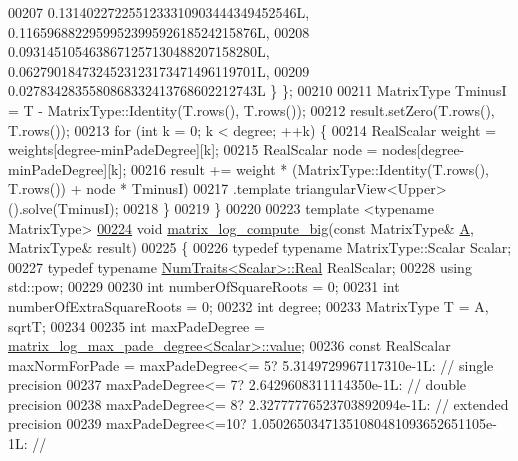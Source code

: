 \begin{DoxyCode}
00207       0.1314022722551233310903444349452546L, 0.1165968822959952399592618524215876L,
00208       0.0931451054638671257130488207158280L, 0.0627901847324523123173471496119701L,
00209       0.0278342835580868332413768602212743L \} \};
00210 
00211   MatrixType TminusI = T - MatrixType::Identity(T.rows(), T.rows());
00212   result.setZero(T.rows(), T.rows());
00213   \textcolor{keywordflow}{for} (\textcolor{keywordtype}{int} k = 0; k < degree; ++k) \{
00214     RealScalar weight = weights[degree-minPadeDegree][k];
00215     RealScalar node = nodes[degree-minPadeDegree][k];
00216     result += weight * (MatrixType::Identity(T.rows(), T.rows()) + node * TminusI)
00217                        .template triangularView<Upper>().solve(TminusI);
00218   \}
00219 \} 
00220 
00223 \textcolor{keyword}{template} <\textcolor{keyword}{typename} MatrixType>
\hyperlink{namespace_eigen_1_1internal_ac2de7acbbff34ec236ee5e9fdb2eee38}{00224} \textcolor{keywordtype}{void} \hyperlink{namespace_eigen_1_1internal_ac2de7acbbff34ec236ee5e9fdb2eee38}{matrix\_log\_compute\_big}(\textcolor{keyword}{const} MatrixType& \hyperlink{group___core___module_class_eigen_1_1_matrix}{A}, MatrixType& result)
00225 \{
00226   \textcolor{keyword}{typedef} \textcolor{keyword}{typename} MatrixType::Scalar Scalar;
00227   \textcolor{keyword}{typedef} \textcolor{keyword}{typename} \hyperlink{group___core___module_struct_eigen_1_1_num_traits}{NumTraits<Scalar>::Real} RealScalar;
00228   \textcolor{keyword}{using} std::pow;
00229 
00230   \textcolor{keywordtype}{int} numberOfSquareRoots = 0;
00231   \textcolor{keywordtype}{int} numberOfExtraSquareRoots = 0;
00232   \textcolor{keywordtype}{int} degree;
00233   MatrixType T = A, sqrtT;
00234 
00235   \textcolor{keywordtype}{int} maxPadeDegree = \hyperlink{struct_eigen_1_1internal_1_1matrix__log__max__pade__degree}{matrix\_log\_max\_pade\_degree<Scalar>::value};
00236   \textcolor{keyword}{const} RealScalar maxNormForPade = maxPadeDegree<= 5? 5.3149729967117310e-1L:                    \textcolor{comment}{// single
       precision}
00237                                     maxPadeDegree<= 7? 2.6429608311114350e-1L:                    \textcolor{comment}{// double
       precision}
00238                                     maxPadeDegree<= 8? 2.32777776523703892094e-1L:                \textcolor{comment}{//
       extended precision}
00239                                     maxPadeDegree<=10? 1.05026503471351080481093652651105e-1L:    \textcolor{comment}{//
}
\end{DoxyCode}
